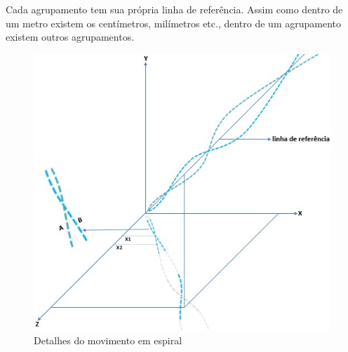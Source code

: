 Cada agrupamento tem sua própria linha de referência. Assim como dentro de um metro existem os centímetros, milímetros etc., dentro de um agrupamento existem outros agrupamentos.
	\begin{figure}[H]
	\caption{Detalhes do movimento em espiral}
	\label{fig:consciousness_space_spiral}
	\centering
	\includegraphics[scale=.8]{sections/images/consciousness_space_spiral.jpg}
	\end{figure}

